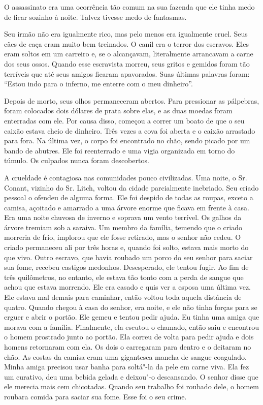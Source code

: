 O assassinato era uma ocorrência tão
comum na sua fazenda que ele tinha medo de ficar sozinho à noite. Talvez
tivesse medo de fantasmas.

Seu irmão não era igualmente rico, mas
pelo menos era igualmente cruel. Seus cães de caça eram muito bem
treinados. O canil era o terror dos escravos. Eles eram soltos em um
carreiro e, se o alcançavam, literalmente arrancavam a carne dos seus
ossos. Quando esse escravista morreu, seus gritos e gemidos foram tão
terríveis que até seus amigos ficaram apavorados. Suas últimas palavras
foram: ``Estou indo para o inferno, me enterre com o meu dinheiro''.

Depois de morto, seus olhos
permaneceram abertos. Para pressionar as pálpebras, foram colocados dois
dólares de prata sobre elas, e as duas moedas foram enterradas com ele.
Por causa disso, começou a correr um boato de que o seu caixão estava
cheio de dinheiro. Três vezes a cova foi aberta e o caixão arrastado
para fora. Na última vez, o corpo foi encontrado no chão, sendo picado
por um bando de abutres. Ele foi reenterrado e uma vigia organizada em
torno do túmulo. Os culpados nunca foram descobertos.

A crueldade é contagiosa nas
comunidades pouco civilizadas. Uma noite, o Sr. Conant, vizinho do Sr.
Litch, voltou da cidade parcialmente inebriado. Seu criado pessoal o
ofendeu de alguma forma. Ele foi despido de todas as roupas, exceto a
camisa, açoitado e amarrado a uma árvore enorme que ficava em frente à
casa. Era uma noite chuvosa de inverno e soprava um vento terrível. Os
galhos da árvore tremiam sob a saraiva. Um membro da família, temendo
que o criado morreria de frio, implorou que ele fosse retirado, mas o
senhor não cedeu. O criado permaneceu ali por três horas e, quando foi
solto, estava mais morto do que vivo. Outro escravo, que havia roubado
um porco do seu senhor para saciar sua fome, recebeu castigos medonhos.
Desesperado, ele tentou fugir. Ao fim de três quilômetros, no entanto,
ele estava tão tonto com a perda de sangue que achou que estava
morrendo. Ele era casado e quis ver a esposa uma última vez. Ele estava
mal demais para caminhar, então voltou toda aquela distância de quatro.
Quando chegou à casa do senhor, era noite, e ele não tinha forças para
se erguer e abrir o portão. Ele gemeu e tentou pedir ajuda. Eu tinha uma
amiga que morava com a família. Finalmente, ela escutou o chamado, então
saiu e encontrou o homem prostrado junto ao portão. Ela correu de volta
para pedir ajuda e dois homens retornaram com ela. Os dois o carregaram
para dentro e o deitaram no chão. As costas da camisa eram uma
gigantesca mancha de sangue coagulado. Minha amiga precisou usar banha
para soltá"-la da pele em carne viva. Ela fez um curativo, deu uma bebida
gelada e deixou"-o descansando. O senhor disse que ele merecia mais cem
chicotadas. Quando seu trabalho foi roubado dele, o homem roubara comida
para saciar sua fome. Esse foi o seu crime.

